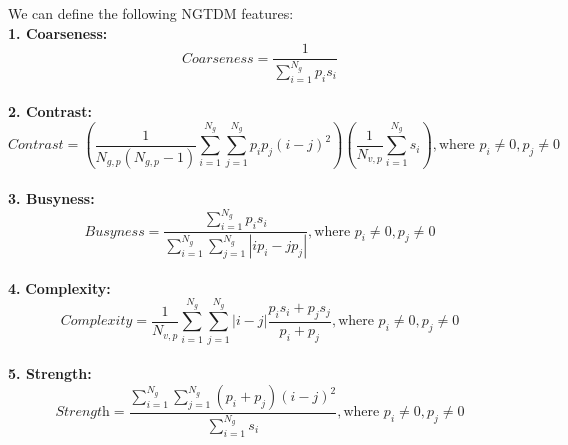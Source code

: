 We can define the following NGTDM features:\\
\textbf{1. Coarseness:}\\
\[\textit{Coarseness}=\frac{1}{\sum _{i=1}^{N_{g}}p_{i}s_{i}}\]\\
\textbf{2. Contrast:}\\
\[\textit{Contrast}=\left(\frac{1}{N_{g,p}\left(N_{g,p}-1\right)}\sum _{i=1}^{N_{g}}\sum _{j=1}^{N_{g}}p_{i}p_{j}\left(i-j\right)^{2}\right)\left(\frac{1}{N_{v,p}}\sum _{i=1}^{N_{g}}s_{i}\right),\text{where } p_{i}\neq 0,p_{j}\neq 0\]\\
\textbf{3. Busyness:}\\
\[\textit{Busyness}=\frac{\sum _{i=1}^{N_{g}}{p_{i}}s_{i}}{\sum _{i=1}^{N_{g}}\sum _{j=1}^{N_{g}}\left|ip_{i}-jp_{j}\right|} ,\text{where } p_{i}\neq 0,p_{j}\neq 0 \]\\
\textbf{4.} \textbf{Complexity:}\\
\[\textit{Complexity}=\frac{1}{N_{v,p}}\sum _{i=1}^{N_{g}} \sum _{j=1}^{N_{g}}\left|i-j\right| \frac{{p_{i}}s_{i}+{p_{j}}s_{j}}{p_{i}+p_{j}},\text{where } p_{i}\neq 0,p_{j}\neq 0 \]\\
\textbf{5. Strength:}\\
\[\textit{Strength}=\frac{\sum _{i=1}^{N_{g}}\sum _{j=1}^{N_{g}}\left(p_{i}+p_{j}\right)\left(i-j\right)^{2}}{\sum _{i=1}^{N_{g}}s_{i}},\text{where } p_{i}\neq 0,p_{j}\neq 0\]


